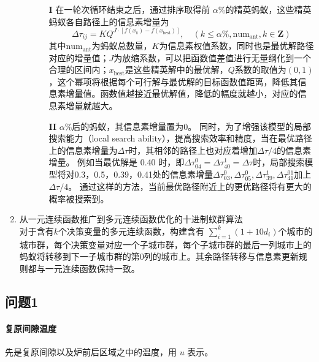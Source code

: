 \documentclass[../main.tex]{subfiles}
\begin{document}
\begin{enumerate}
\begin{enumerate}
\begin{itemize}
\item[\textbf{I}] 在一轮次循环结束之后，通过排序取得前 \(\alpha \%\)的精英蚂蚁，这些精英蚂蚁各自路径上的信息素增量为
\begin{equation}\label{equ:pass2}
\Delta \tau _{ij} = K Q ^{J \cdot [f (x_{k}) - f (x _{\mathrm{best}})]} , \quad (k \le \alpha \% , \mathrm{num}_{\mathrm{ant}} , k \in \mathbf{Z})
\end{equation}
其中\(\mathrm{num}_{\mathrm{ant}}\)为蚂蚁总数量，\(K\)为信息素权值系数，同时也是最优解路径对应的增量值；\(J\)为放缩系数，可以把函数值差值进行无量纲化到一个合理的区间内；\(x_{\mathrm{best}}\)是这些精英解中的最优解，\(Q\)系数的取值为\((0,1)\)，这个幂项将根据每个可行解与最优解的目标函数值距离，降低其信息素增量值。函数值越接近最优解值，降低的幅度就越小，对应的信息素增量就越大。
\item[\textbf{II}] \(\alpha \%\)后的蚂蚁，其信息素增量置为0。
同时，为了增强该模型的局部搜索能力（local search ability），提高搜索效率和精度，当在最优路径上的信息素增量为\(\Delta \tau\)时，其相邻的路径上也对应着增加\(\Delta \tau / 4\)的信息素增量。
例如当最优解是 0.40 时，即\(\Delta \tau _{0 4} ^{0} = \Delta \tau ^{1} _{4 0} = \Delta \tau\)时，局部搜索模型将对0.3，0.5，0.39，0.41处的信息素增量\(\Delta \tau ^{0} _{03}, \Delta \tau_{05} ^{0} , \Delta \tau _{39} ^{1} , \Delta\tau _{41}^{01}\)加上\(\Delta \tau / 4\)。
通过这样的方法，当前最优路径附近上的更优路径将有更大的概率被搜索到。
\end{itemize}

\end{enumerate}
\item 从一元连续函数推广到多元连续函数优化的十进制蚁群算法\\
对于含有\(k\)个决策变量的多元连续函数，构建含有
\(\sum_{i = 1} ^{k} (1+ 10 d_{i})\)个城市的城市群，每个决策变量对应一个子城市群，每个子城市群的最后一列城市上的蚂蚁将转移到下一子城市群的第0列的城市上。其余路径转移与信息素更新规则都与一元连续函数保持一致。
\end{enumerate}
\subsection{问题1}

\paragraph{复原间隙温度} 先是复原间隙以及炉前后区域之中的温度，用 \(u\) 表示。
\end{document}
